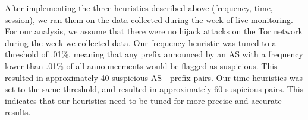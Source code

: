 After implementing the three heuristics described above (frequency, time, session), we ran them on the data collected during the week of live monitoring.  For our analysis, we assume that there were no hijack attacks on the Tor network during the week we collected data.  Our frequency heuristic was tuned to a threshold of .01\%, meaning that any prefix announced by an AS with a frequency lower than .01\% of all announcements would be flagged as suspicious.  This resulted in approximately 40 suspicious AS - prefix pairs.  Our time heuristics was set to the same threshold, and resulted in approximately 60 suspicious pairs.  This indicates that our heuristics need to be tuned for more precise and accurate results. 
